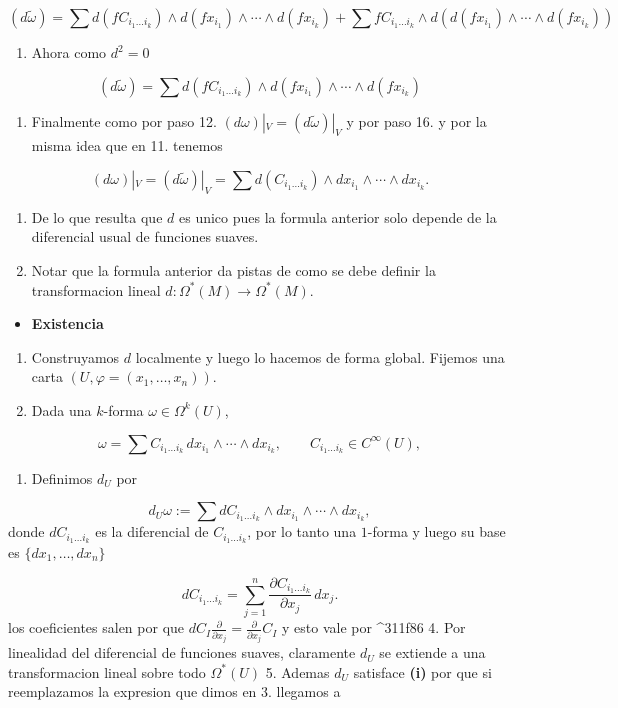 \begin{bookproof}{}
\[
(d\widetilde\omega)=\sum d(fC_{i_1\ldots i_k})\wedge d(fx_{i_1})\wedge\cdots\wedge d(fx_{i_k})+\sum fC_{i_1\ldots i_k}\wedge d( d(fx_{i_1})\wedge\cdots\wedge d(fx_{i_k}))
\]
\begin{enumerate}[start=15]
\item Ahora como $d^{2}=0$
\end{enumerate}
\[
(d\widetilde\omega)=\sum d(fC_{i_1\ldots i_k})\wedge d(fx_{i_1})\wedge\cdots\wedge d(fx_{i_k})
\]
\begin{enumerate}[start=16]
\item Finalmente como por paso 12. $(d\omega)|_{V}=(d \widetilde{\omega})|_{V}$ y por paso 16. y por la misma idea que en 11. tenemos
\end{enumerate}
\[
(d\omega)|_V=(d \widetilde{\omega})|_{V}=\sum d(C_{i_1\ldots i_k})\wedge dx_{i_1}\wedge\cdots\wedge dx_{i_k}.
\]
\begin{enumerate}[start=17]
\item De lo que resulta que $d$ es unico pues la formula anterior solo depende de la diferencial usual de funciones suaves.
\item Notar que la formula anterior da pistas de como se debe definir la transformacion lineal $d:\Omega^*(M)\to\Omega^*(M)$.
\end{enumerate}
\begin{itemize}
\item \textbf{Existencia}
\end{itemize}
\begin{enumerate}
\item Construyamos $d$ localmente y luego lo hacemos de forma global. Fijemos una carta $(U,\varphi=(x_1,\ldots,x_n))$.
\item Dada una $k$-forma $\omega\in\Omega^k(U)$,
\end{enumerate}
\[
\omega=\sum C_{i_1\ldots i_k}\,dx_{i_1}\wedge\cdots\wedge dx_{i_k},\qquad C_{i_1\ldots i_k}\in C^\infty(U),
\]
\begin{enumerate}[start=3]
\item Definimos $d_U$ por
\end{enumerate}
\[
d_U\omega:=\sum dC_{i_1\ldots i_k}\wedge dx_{i_1}\wedge\cdots\wedge dx_{i_k},
\]
donde $dC_{i_1\ldots i_k}$ es la diferencial de $C_{i_1\ldots i_k}$, por lo tanto una $1$-forma y luego su base es $\{ dx_{1},\ldots,dx_{n} \}$

\[
dC_{i_1\ldots i_k}=\sum_{j=1}^n\frac{\partial C_{i_1\ldots i_k}}{\partial x_j}\,dx_j.
\]
los coeficientes salen por que $dC_{I}\frac{\partial}{\partial x_{j}}=\frac{\partial}{\partial x_{j}}C_{I}$ y esto vale por \textasciicircum{}311f86 4. Por linealidad del diferencial de funciones suaves, claramente $d_U$ se extiende a una transformacion lineal sobre todo $\Omega^*(U)$ 5. Ademas $d_U$ satisface \textbf{(i)} por que si reemplazamos la expresion que dimos en 3. llegamos a


\end{bookproof}
